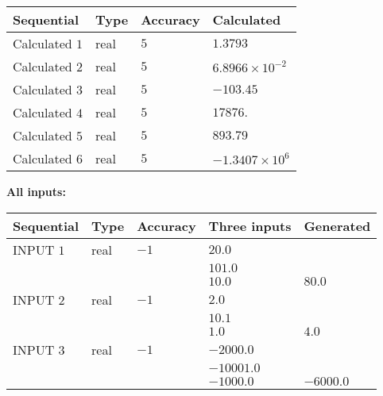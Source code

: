 \documentclass[12pt]{article}
\begin{document}
   
   
   
\noindent{}
   
   
  
  
\noindent\begin{tabular}{|l|l|l|l|}
\hline
 Sequential & Type & Accuracy & Calculated \\ 
\hline
 
 
  Calculated $           1$ & real & $           5 $ & 
 $ 1.3793 $ 
 \\  \hline  
 
 
  Calculated $           2$ & real & $           5 $ & 
 $ 6.8966 \times 10^{-2} $ 
 \\  \hline  
 
 
  Calculated $           3$ & real & $           5 $ & 
 $ -103.45 $ 
 \\  \hline  
 
 
  Calculated $           4$ & real & $           5 $ & 
 $ 17876. $ 
 \\  \hline  
 
 
  Calculated $           5$ & real & $           5 $ & 
 $ 893.79 $ 
 \\  \hline  
 
 
  Calculated $           6$ & real & $           5 $ & 
 $ -1.3407 \times 10^{6} $ 
 \\  \hline  
 \end{tabular}
   
   
   
   
\noindent\vspace{0.1in}\hspace{-0.08in} {\textbf{\Large{All inputs: }}}
   
   
  
  
\noindent\begin{tabular}{|l|l|l|l|l|}
\hline
 Sequential & Type & Accuracy & Three inputs & Generated \\ 
\hline
 
 
  INPUT $           1$ & real & $          -1 $ & $
 20.0
  $ & \\
  & & &  $
 101.0
  $ & \\
  & & &  $
 10.0
 $ & $ 80.0 $ 
 \\  \hline  
 
 
  INPUT $           2$ & real & $          -1 $ & $
 2.0
  $ & \\
  & & &  $
 10.1
  $ & \\
  & & &  $
 1.0
 $ & $ 4.0 $ 
 \\  \hline  
 
 
  INPUT $           3$ & real & $          -1 $ & $
 -2000.0
  $ & \\
  & & &  $
 -10001.0
  $ & \\
  & & &  $
 -1000.0
 $ & $ -6000.0 $ 
 \\  \hline  
 \end{tabular}
   
\end{document}
